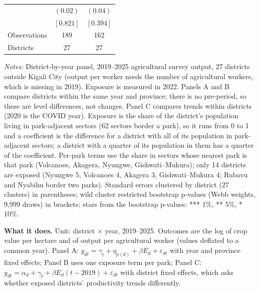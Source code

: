 \documentclass[11pt]{article}
\begin{document}
\begin{table}[H]
\begin{tabular}{lcc}
 & $(0.02)$ & $(0.04)$ \\
 & $[0.821]$ & $[0.394]$ \\
\midrule
Observations & 189 & 162 \\
Districts & 27 & 27 \\
\bottomrule
\end{tabular}
\begin{minipage}{0.95\textwidth}\footnotesize
\textit{Notes:} District-by-year panel, 2019--2025 agricultural survey output, 27 districts outside Kigali City (output per worker needs the number of agricultural workers, which is missing in 2019). Exposure is measured in 2022. Panels A and B compare districts within the same year and province; there is no pre-period, so these are level differences, not changes. Panel C compares trends within districts (2020 is the COVID year). Exposure is the share of the district's population living in park-adjacent sectors (62 sectors border a park), so it runs from 0 to 1 and a coefficient is the difference for a district with all of its population in park-adjacent sectors; a district with a quarter of its population in them has a quarter of the coefficient. Per-park terms use the share in sectors whose nearest park is that park (Volcanoes, Akagera, Nyungwe, Gishwati--Mukura); only 14 districts are exposed (Nyungwe 5, Volcanoes 4, Akagera 3, Gishwati--Mukura 4; Rubavu and Nyabihu border two parks). Standard errors clustered by district (27 clusters) in parentheses; wild cluster restricted bootstrap p-values (Webb weights, 9,999 draws) in brackets; stars from the bootstrap p-values: *** 1\%, ** 5\%, * 10\%.
\end{minipage}
\end{table}
\textbf{What it does.} Unit: district $\times$ year, 2019--2025. Outcomes are the log of crop value per hectare and of output per agricultural worker (values deflated to a common year). Panel A: $y_{dt} = \gamma_t + \eta_{p(d)} + \beta E_d + \varepsilon_{dt}$ with year and province fixed effects; Panel B uses one exposure term per park; Panel C: $y_{dt} = \alpha_d + \gamma_t + \beta E_d (t-2019) + \varepsilon_{dt}$ with district fixed effects, which asks whether exposed districts' productivity trends differently.
\end{document}
